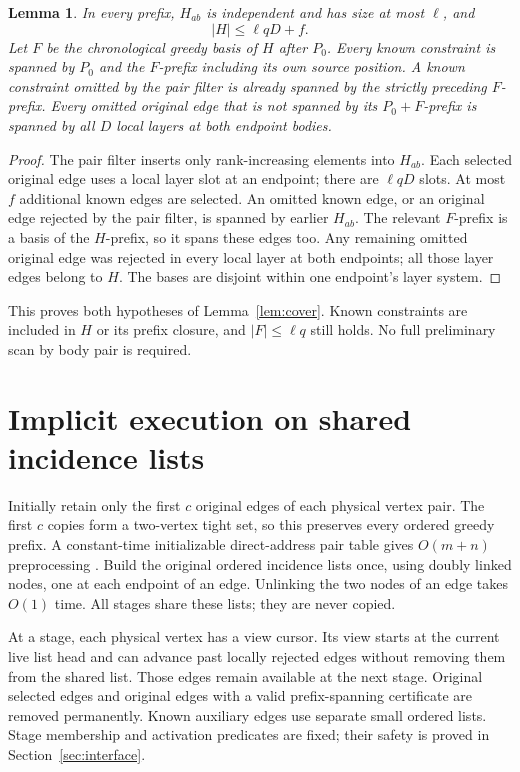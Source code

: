 \documentclass[11pt,a4paper]{article}
\newtheorem{lemma}[theorem]{Lemma}
\theoremstyle{definition}
\theoremstyle{remark}
\begin{document}
\begin{lemma}\label{lem:adaptive-sample}
In every prefix, $H_{ab}$ is independent and has size at
most $\ell$, and
\[
 |H|\leq\ell qD+f.
\]
Let $F$ be the chronological greedy basis of $H$ after
$P_0$. Every known constraint is spanned by $P_0$ and
the $F$-prefix including its own source position. A known
constraint omitted by the pair filter is already spanned by the
strictly preceding $F$-prefix. Every omitted original
edge that is not spanned by its $P_0+F$-prefix is spanned
by all $D$ local layers at both endpoint bodies.
\end{lemma}
\begin{proof}
The pair filter inserts only rank-increasing elements
into $H_{ab}$. Each selected original edge uses a local
layer slot at an endpoint; there are $\ell qD$ slots.
At most $f$ additional known edges are selected.
An omitted known edge, or an original edge rejected by
the pair filter, is spanned by earlier $H_{ab}$.
The relevant $F$-prefix is a basis of the $H$-prefix,
so it spans these edges too.
Any remaining omitted original edge was rejected in
every local layer at both endpoints; all those layer
edges belong to $H$. The bases are disjoint within
one endpoint's layer system.
\end{proof}

This proves both hypotheses of Lemma~\ref{lem:cover}.
Known constraints are included in $H$ or its prefix
closure, and $|F|\leq\ell q$ still holds.
No full preliminary scan by body pair is required.

\section{Implicit execution on shared incidence lists}
\label{sec:implicit}

Initially retain only the first $c$ original edges of
each physical vertex pair. The first $c$ copies form
a two-vertex tight set, so this preserves every ordered
greedy prefix. A constant-time initializable direct-address
pair table gives $O(m+n)$ preprocessing \cite{initializable}.
Build the original ordered incidence lists once, using
doubly linked nodes, one at each endpoint of an edge.
Unlinking the two nodes of an edge takes $O(1)$ time.
All stages share these lists; they are never copied.

At a stage, each physical vertex has a view cursor.
Its view starts at the current live list head and can
advance past locally rejected edges without removing
them from the shared list. Those edges remain available
at the next stage. Original selected edges and original
edges with a valid prefix-spanning certificate are
removed permanently.
Known auxiliary edges use separate small ordered lists.
Stage membership and activation predicates are fixed;
their safety is proved in Section~\ref{sec:interface}.
\end{document}
